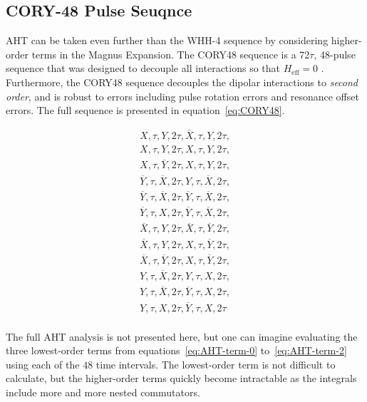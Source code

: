\subsection{CORY-48 Pulse Seuqnce}\label{subsec:CORY48}

AHT can be taken even further than the WHH-4 sequence by considering higher-order terms in the Magnus Expansion. The CORY48 sequence is a 72$\tau$, 48-pulse sequence that was designed to decouple all interactions so that $H_{\text{eff}} = 0$ \cite{CORY1990205}. Furthermore, the CORY48 sequence decouples the dipolar interactions to \emph{second order}, and is robust to errors including pulse rotation errors and resonance offset errors. The full sequence is presented in equation~\ref{eq:CORY48}.

\begin{align}\label{eq:CORY48}
    X, \tau, Y, 2\tau, \overline{X}, \tau, Y, 2\tau, \\
    X, \tau, Y, 2\tau, X, \tau, Y, 2\tau, \\
    X, \tau, \overline{Y}, 2\tau, X, \tau, Y, 2\tau, \\
    \overline{Y}, \tau, \overline{X}, 2\tau, Y, \tau, \overline{X}, 2\tau, \\
    \overline{Y}, \tau, \overline{X}, 2\tau, \overline{Y}, \tau, \overline{X}, 2\tau, \\
    \overline{Y}, \tau, X, 2\tau, \overline{Y}, \tau, \overline{X}, 2\tau, \\
    \overline{X}, \tau, Y, 2\tau, \overline{X}, \tau, \overline{Y}, 2\tau, \\
    \overline{X}, \tau, Y, 2\tau, X, \tau, \overline{Y}, 2\tau, \\
    \overline{X}, \tau, \overline{Y}, 2\tau, X, \tau, \overline{Y}, 2\tau, \\
    Y, \tau, \overline{X}, 2\tau, Y, \tau, X, 2\tau, \\
    Y, \tau, \overline{X}, 2\tau, \overline{Y}, \tau, X, 2\tau, \\
    Y, \tau, X, 2\tau, \overline{Y}, \tau, X, 2\tau \\
\end{align}

The full AHT analysis is not presented here, but one can imagine evaluating the three lowest-order terms from equations~\ref{eq:AHT-term-0} to~\ref{eq:AHT-term-2} using each of the $48$ time intervals. The lowest-order term is not difficult to calculate, but the higher-order terms quickly become intractable as the integrals include more and more nested commutators.


